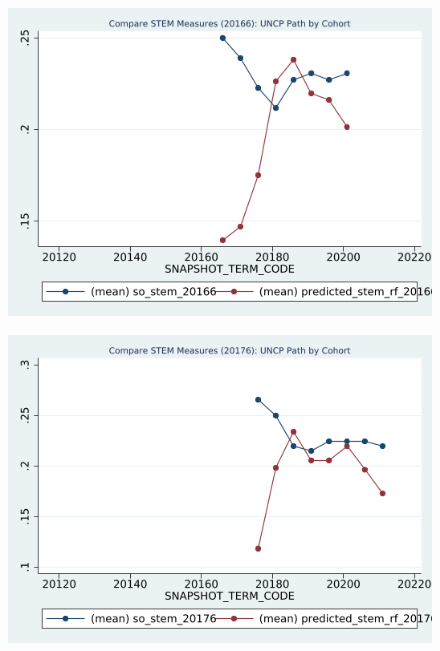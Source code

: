 \begin{figure}[h!]
\begin{centering}
\includegraphics[scale=1]{"figures/UNCP_20166_COMPARE_path_by_cohort_CAREER_STEM"}
\end{centering}
\end{figure}
\newpage
\begin{figure}[h!]
\begin{centering}
\includegraphics[scale=1]{"figures/UNCP_20176_COMPARE_path_by_cohort_CAREER_STEM"}
\end{centering}
\end{figure}
\newpage
